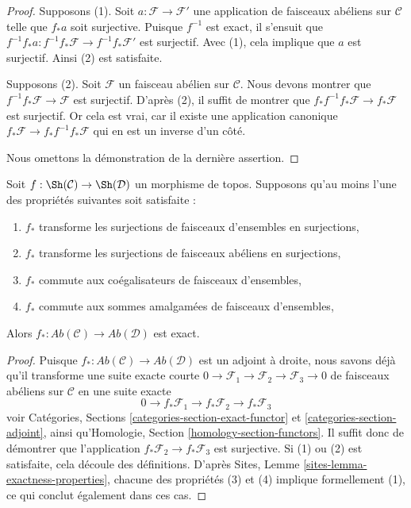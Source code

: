 \begin{proof}
Supposons (1). Soit $a : \mathcal{F} \to \mathcal{F}'$ une application de
faisceaux abéliens sur $\mathcal{C}$ telle que $f_*a$ soit surjective. Puisque
$f^{-1}$ est exact, il s'ensuit que
$f^{-1}f_*a : f^{-1}f_*\mathcal{F} \to f^{-1}f_*\mathcal{F}'$
est surjectif. Avec (1), cela implique que $a$ est surjectif. Ainsi (2) est
satisfaite.

\medskip\noindent
Supposons (2). Soit $\mathcal{F}$ un faisceau abélien sur $\mathcal{C}$. Nous
devons montrer que $f^{-1}f_*\mathcal{F} \to \mathcal{F}$ est surjectif.
D'après (2), il suffit de montrer que
$f_*f^{-1}f_*\mathcal{F} \to f_*\mathcal{F}$ est surjectif. Or cela est vrai,
car il existe une application canonique
$f_*\mathcal{F} \to f_*f^{-1}f_*\mathcal{F}$ qui en est un inverse d'un côté.

\medskip\noindent
Nous omettons la démonstration de la dernière assertion.
\end{proof}

\begin{lemma}
\label{lemma-exactness}
Soit $f : \Sh(\mathcal{C}) \to \Sh(\mathcal{D})$ un morphisme de topos.
Supposons qu'au moins l'une des propriétés suivantes soit satisfaite :
\begin{enumerate}
\item $f_*$ transforme les surjections de faisceaux d'ensembles en
surjections,
\item $f_*$ transforme les surjections de faisceaux abéliens en surjections,
\item $f_*$ commute aux coégalisateurs de faisceaux d'ensembles,
\item $f_*$ commute aux sommes amalgamées de faisceaux d'ensembles,
\end{enumerate}
Alors $f_* : \textit{Ab}(\mathcal{C}) \to \textit{Ab}(\mathcal{D})$ est
exact.
\end{lemma}

\begin{proof}
Puisque $f_* : \textit{Ab}(\mathcal{C}) \to \textit{Ab}(\mathcal{D})$ est un
adjoint à droite, nous savons déjà qu'il transforme une suite exacte courte
$0 \to \mathcal{F}_1 \to \mathcal{F}_2 \to \mathcal{F}_3 \to 0$
de faisceaux abéliens sur $\mathcal{C}$ en une suite exacte
$$
0 \to f_*\mathcal{F}_1 \to f_*\mathcal{F}_2 \to f_*\mathcal{F}_3
$$
voir Catégories, Sections \ref{categories-section-exact-functor} et
\ref{categories-section-adjoint}, ainsi qu'Homologie, Section
\ref{homology-section-functors}. Il suffit donc de démontrer que l'application
$f_*\mathcal{F}_2 \to f_*\mathcal{F}_3$ est surjective. Si (1) ou (2) est
satisfaite, cela découle des définitions. D'après Sites, Lemme
\ref{sites-lemma-exactness-properties}, chacune des propriétés (3) et (4)
implique formellement (1), ce qui conclut également dans ces cas.
\end{proof}

